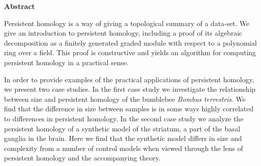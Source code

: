 \newenvironment{abstract}%
    {\cleardoublepage\thispagestyle{empty}\null\vfill\begin{center}%
    \bfseries Abstract \end{center}}%
    {\vfill\null}
        \begin{abstract}
          Persistent homology is a way of giving a topological summary of a data-set. We give an introduction to   persistent homology, including a proof of its algebraic decomposition as a finitely generated graded module with respect to a polynomial ring over a field. This proof is constructive and yields an algorithm for computing persistent homology in a practical sense.

          In order to provide examples of the practical applications of persistent homology, we present two case studies. In the first case study we investigate the relationship between size and persistent homology of the bumblebee \textit{Bombus terrestris}. We find that the difference in size between samples is in some ways highly correlated to differences in persistent homology. In the second case study we analyze the persistent homology of a synthetic model of the striatum, a part of the basal ganglia in the brain. Here we find that the synthetic model differs in size and complexity from a number of control models when viewed through the lens of persistent homology and the accompanying theory. \end{abstract}
